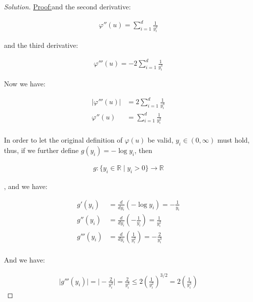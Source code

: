 \documentclass{article}
\newenvironment{solution}
  {\renewcommand\qedsymbol{$\blacksquare$}\begin{proof}[Solution]}
  {\end{proof}}
\newenvironment{claimproof}[1]{\par\noindent\underline{Proof:}\space#1}{}
\begin{document}
\begin{solution}
\begin{claimproof}
    and the second derivative:

    \begin{align*}
        \varphi''(u) = \sum_{i=1}^d \frac{1}{y_i^2}
    \end{align*}

    and the third derivative:
    
    \begin{align*}
        \varphi'''(u) = -2 \sum_{i=1}^d \frac{1}{y_i^3}
    \end{align*}

    Now we have:
    
    \begin{align*}
        |\varphi'''(u)| &= 2 \sum_{i=1}^d \frac{1}{y_i^3} \\
        \varphi''(u) &= \sum_{i=1}^d \frac{1}{y_i^2} \\
    \end{align*}



    In order to let the original definition of $\varphi(u)$ be valid, $y_i \in (0, \infty)$ must hold, 
    thus, if we further define $g(y_i) = - \log y_i$, 
    then 
    
    \begin{align*}
        g : \{y_i \in \mathbb{R} \mid y_i > 0\} \rightarrow \mathbb{R}
    \end{align*}

    , and we have:

    \begin{align*}
        g'(y_i) &= \frac{d}{dy_i} (- \log y_i) = -\frac{1}{y_i} \\
        g''(y_i) &= \frac{d}{dy_i} \left( -\frac{1}{y_i} \right) = \frac{1}{y_i^2} \\
        g'''(y_i) &= \frac{d}{dy_i} \left( \frac{1}{y_i^2} \right) = -\frac{2}{y_i^3} \\
    \end{align*}

    And we have:

    \begin{align*}
        \mid g'''(y_i) \mid = \mid -\frac{2}{y_i^3} \mid = \frac{2}{y_i^3} \leq 2 \left( \frac{1}{y_i^2} \right)^{3/2} = 2 \left(\frac{1}{y_i^3} \right)
    \end{align*}


\end{claimproof}
\end{solution}
\end{document}

